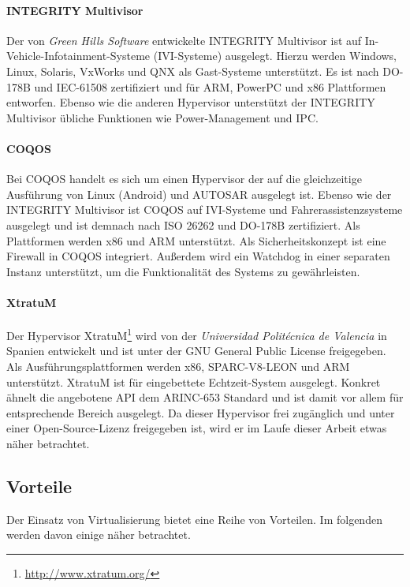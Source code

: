 \documentclass[
  a4paper,					    %
  twoside,
  DIV=calc,     				%
  bibliography=totoc,
  cleardoublepage=empty,
  ngerman,     					%
  final       					%
]{scrbook}
\begin{document}
\paragraph{INTEGRITY Multivisor}
Der von \emph{Green Hills Software} entwickelte INTEGRITY Multivisor ist auf In-Vehicle-Infotainment-Systeme (IVI-Systeme) ausgelegt. Hierzu werden Windows, Linux, Solaris, VxWorks und QNX als Gast-Systeme unterstützt. Es ist nach DO-178B und IEC-61508 zertifiziert und für ARM, PowerPC und x86 Plattformen entworfen. Ebenso wie die anderen Hypervisor unterstützt der INTEGRITY Multivisor übliche Funktionen wie Power-Management und IPC.

\paragraph{COQOS}
Bei COQOS handelt es sich um einen Hypervisor der auf die gleichzeitige Ausführung von Linux (Android) und AUTOSAR ausgelegt ist. Ebenso wie der INTEGRITY Multivisor ist COQOS auf IVI-Systeme und Fahrerassistenzsysteme ausgelegt und ist demnach nach ISO 26262 und DO-178B zertifiziert. Als Plattformen werden x86 und ARM unterstützt. Als Sicherheitskonzept ist eine Firewall in COQOS integriert. Außerdem wird ein Watchdog in einer separaten Instanz unterstützt, um die Funktionalität des Systems zu gewährleisten.

\paragraph{XtratuM}
Der Hypervisor XtratuM\footnote{\url{http://www.xtratum.org/}} wird von der \emph{Universidad Politécnica de Valencia} in Spanien entwickelt und ist unter der GNU General Public License freigegeben. Als Ausführungsplattformen werden x86, SPARC-V8-LEON und ARM unterstützt. XtratuM ist für eingebettete Echtzeit-System ausgelegt. Konkret ähnelt die angebotene API dem ARINC-653 Standard und ist damit vor allem für entsprechende Bereich ausgelegt. Da dieser Hypervisor frei zugänglich und unter einer Open-Source-Lizenz freigegeben ist, wird er im Laufe dieser Arbeit etwas näher betrachtet.





\subsection{Vorteile}
Der Einsatz von Virtualisierung bietet eine Reihe von Vorteilen\cite{wiki:emb_hyp}. Im folgenden werden davon einige näher betrachtet.
\end{document}
